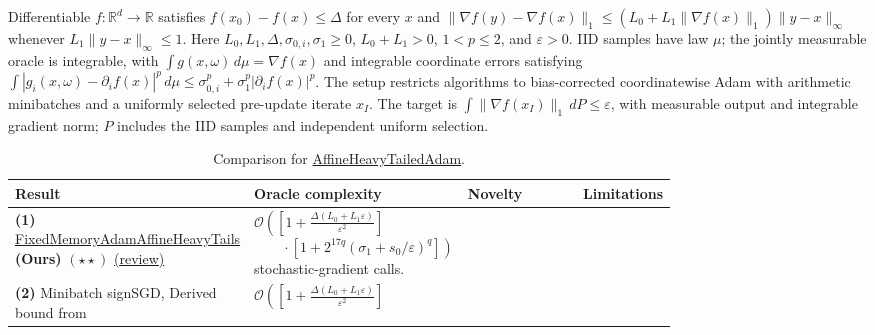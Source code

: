 \begin{table}[tp]
\centering
\caption{Comparison for \href{https://github.com/k3nfalt/longtails/blob/main/LongTails/Setups/AffineHeavyTailedAdam.lean}{AffineHeavyTailedAdam}.}\label{tab:AffineHeavyTailedAdam}
\parbox{\linewidth}{\footnotesize Differentiable $f:\mathbb R^d\to\mathbb R$ satisfies $f(x_0)-f(x)\le\Delta$ for every $x$ and
$\|\nabla f(y)-\nabla f(x)\|_1\le(L_0+L_1\|\nabla f(x)\|_1)\|y-x\|_\infty$ whenever $L_1\|y-x\|_\infty\le1$.
Here $L_0,L_1,\Delta,\sigma_{0,i},\sigma_1\ge0$, $L_0+L_1>0$, $1<p\le2$, and $\varepsilon>0$.
IID samples have law $\mu$; the jointly measurable oracle is integrable, with
$\int g(x,\omega)\,d\mu=\nabla f(x)$ and integrable coordinate errors satisfying
$\int|g_i(x,\omega)-\partial_i f(x)|^p\,d\mu\le\sigma_{0,i}^p+\sigma_1^p|\partial_i f(x)|^p$.
The setup restricts algorithms to bias-corrected coordinatewise Adam with arithmetic minibatches and a uniformly selected pre-update iterate $x_I$.
The target is $\int\|\nabla f(x_I)\|_1\,dP\le\varepsilon$, with measurable output and integrable gradient norm; $P$ includes the IID samples and independent uniform selection.}\par\smallskip
\begin{threeparttable}
\footnotesize
\setlength{\tabcolsep}{4pt}\renewcommand{\arraystretch}{1.25}
\begin{tabularx}{\linewidth}{@{}>{\raggedright\arraybackslash}p{0.20\linewidth}>{\raggedright\arraybackslash}p{0.32\linewidth}>{\raggedright\arraybackslash}p{0.25\linewidth}>{\raggedright\arraybackslash}X@{}}
\toprule
\textbf{Result} & \textbf{Oracle complexity} & \textbf{Novelty} & \textbf{Limitations} \\
\midrule
\textbf{(1)} \href{https://github.com/k3nfalt/longtails/blob/main/LongTails/Theorems/FixedMemoryAdamAffineHeavyTails.lean}{Fixed\allowbreak Memory\allowbreak Adam\allowbreak Affine\allowbreak Heavy\allowbreak Tails} \textbf{(Ours)} $(\star\star)$ \href{https://github.com/k3nfalt/longtails/blob/main/scripts/reviews/FixedMemoryAdamAffineHeavyTails.md}{(review)}
& $\mathcal O\!\left(\left[1+\frac{\Delta(L_0+L_1\varepsilon)}{\varepsilon^2}\right]\right.$\newline
$\left.\qquad\cdot\left[1+2^{17q}(\sigma_1+s_0/\varepsilon)^q\right]\right)$ stochastic-gradient calls.
& & \\
\midrule[1.2pt]
\textbf{(2)} Minibatch signSGD, Derived bound from \citep{ahtaKornilov2025v2}
& $\mathcal O\!\left(\left[1+\frac{\Delta(L_0+L_1\varepsilon)}{\varepsilon^2}\right]\right.$\newline

\end{tabularx}
\end{threeparttable}
\end{table}
